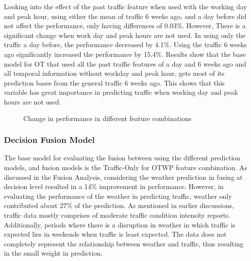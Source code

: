 Looking into the effect of the past traffic feature when used with the working day and peak hour, using either the mean of traffic 6 weeks ago, and a day before did not affect the performance, only having differences of 0.03\%. However, There is a significant change when work day and peak hours are not used. In using only the traffic a day before, the performance decreased by 4.1\%. Using the traffic 6 weeks ago significantly increased the performance by 15.4\%. Results show that the base model for OT that used all the past traffic features of a day and 6 weeks ago and all temporal information without workday and peak hour, gets most of its prediction bases from the general traffic 6 weeks ago. This shows that this variable has great importance in predicting traffic when working day and peak hours are not used.  

\begin{figure}[h]
  \centering
  \captionsetup{justification=centering}
  \caption{Change in performance in different feature combinations}
  \label{fig:pm1-pm2-df-changes}
\end{figure}

\subsubsection{Decision Fusion Model}

The base model for evaluating the fusion between using the different prediction models, and fusion models is the Traffic-Only for OTWP feature combination. As discussed in the Fusion Analysis, considering the weather prediction in fusing at decision level resulted in a 14\% improvement in performance. However, in evaluating the performance of the weather in predicting traffic, weather only contributed about 27\% of the prediction. As mentioned in earlier discussions, traffic data mostly comprises of moderate traffic condition intensity reports. Additionally, periods where there is a disruption in weather in which traffic is expected lies in weekends when traffic is least expected. The data does not completely represent the relationship between weather and traffic, thus resulting in the small weight in prediction. 





































